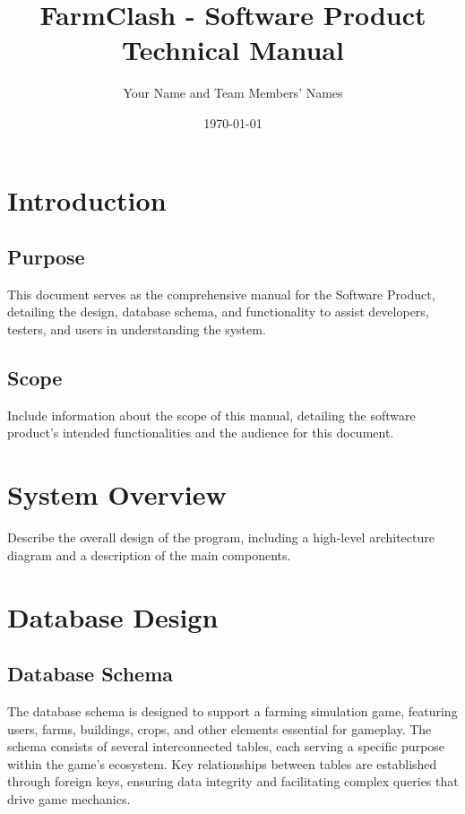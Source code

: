 \documentclass[12pt]{article}
\title{FarmClash - Software Product Technical Manual}
\author{Your Name and Team Members' Names}
\date{\today}
\begin{document}
\maketitle
\tableofcontents
\newpage

\section{Introduction}
\subsection{Purpose}
This document serves as the comprehensive manual for the Software Product, detailing the design, database schema, and functionality to assist developers, testers, and users in understanding the system.

\subsection{Scope}
Include information about the scope of this manual, detailing the software product's intended functionalities and the audience for this document.

\section{System Overview}
Describe the overall design of the program, including a high-level architecture diagram and a description of the main components.

\section{Database Design}
\subsection{Database Schema}
The database schema is designed to support a farming simulation game, featuring users, farms, buildings, crops, and other elements essential for gameplay. The schema consists of several interconnected tables, each serving a specific purpose within the game's ecosystem. Key relationships between tables are established through foreign keys, ensuring data integrity and facilitating complex queries that drive game mechanics.
\end{document}
